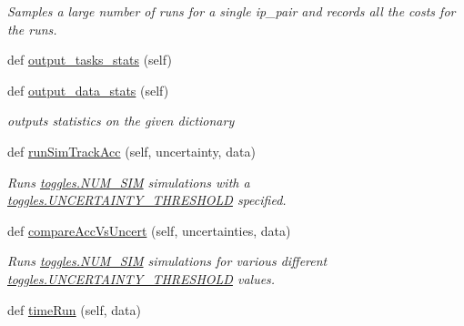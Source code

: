 \begin{DoxyCompactItemize}
\begin{DoxyCompactList}\small\item\em Samples a large number of runs for a single ip\+\_\+pair and records all the costs for the runs. \end{DoxyCompactList}\item 
def \hyperlink{classdynamicfilterapp_1_1test__simulations_1_1_simulation_test_aed5cf6d5470f93d7a538e4c2c7a8bb34}{output\+\_\+tasks\+\_\+stats} (self)
\item 
def \hyperlink{classdynamicfilterapp_1_1test__simulations_1_1_simulation_test_a6dfab9d9ce87cf8f1421f01d5e9051e0}{output\+\_\+data\+\_\+stats} (self)
\begin{DoxyCompactList}\small\item\em outputs statistics on the given dictionary \end{DoxyCompactList}\item 
def \hyperlink{classdynamicfilterapp_1_1test__simulations_1_1_simulation_test_a87a8325e13e3f2641a3371a9c72c9583}{run\+Sim\+Track\+Acc} (self, uncertainty, data)
\begin{DoxyCompactList}\small\item\em Runs \hyperlink{namespacedynamicfilterapp_1_1toggles_a3baf5565851cd87736238d8dddfc1106}{toggles.\+N\+U\+M\+\_\+\+S\+IM} simulations with a \hyperlink{namespacedynamicfilterapp_1_1toggles_aaefdc27b85545eb4a910f5c65f7d8bbb}{toggles.\+U\+N\+C\+E\+R\+T\+A\+I\+N\+T\+Y\+\_\+\+T\+H\+R\+E\+S\+H\+O\+LD} specified. \end{DoxyCompactList}\item 
def \hyperlink{classdynamicfilterapp_1_1test__simulations_1_1_simulation_test_a1395b2cd07f422278160348baec14c9b}{compare\+Acc\+Vs\+Uncert} (self, uncertainties, data)
\begin{DoxyCompactList}\small\item\em Runs \hyperlink{namespacedynamicfilterapp_1_1toggles_a3baf5565851cd87736238d8dddfc1106}{toggles.\+N\+U\+M\+\_\+\+S\+IM} simulations for various different \hyperlink{namespacedynamicfilterapp_1_1toggles_aaefdc27b85545eb4a910f5c65f7d8bbb}{toggles.\+U\+N\+C\+E\+R\+T\+A\+I\+N\+T\+Y\+\_\+\+T\+H\+R\+E\+S\+H\+O\+LD} values. \end{DoxyCompactList}\item 
def \hyperlink{classdynamicfilterapp_1_1test__simulations_1_1_simulation_test_a6977d93287474dfe398931c8c0b381c3}{time\+Run} (self, data)

\end{DoxyCompactItemize}
